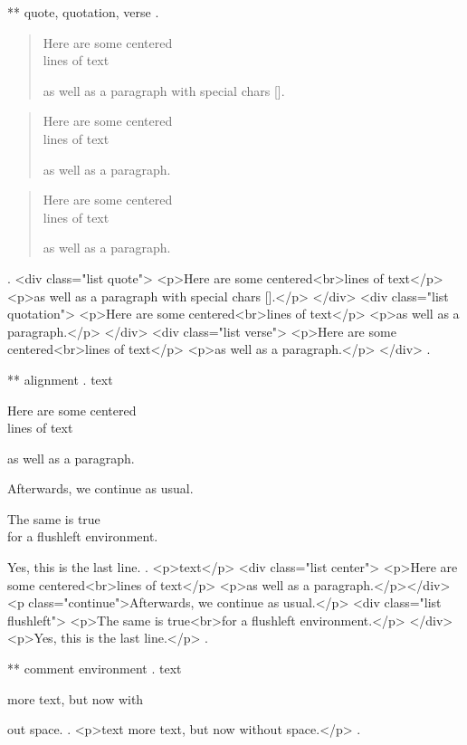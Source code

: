 ** quote, quotation, verse
.
\begin{quote}
    Here are some centered\\
    lines of text

    as well as a paragraph with special chars [].
\end{quote}

\begin{quotation}
    Here are some centered\\
    lines of text

    as well as a paragraph.
\end{quotation}

\begin{verse}
    Here are some centered\\
    lines of text

    as well as a paragraph.
\end{verse}
.
<div class="list quote">
<p>Here are some centered<br>lines of text</p>
<p>as well as a paragraph with special chars [].</p>
</div>
<div class="list quotation">
<p>Here are some centered<br>lines of text</p>
<p>as well as a paragraph.</p>
</div>
<div class="list verse">
<p>Here are some centered<br>lines of text</p>
<p>as well as a paragraph.</p>
</div>
.


** alignment
.
text
\begin{center}
    Here are some centered\\
    lines of text

    as well as a paragraph.
\end{center}
Afterwards, we continue as usual.
\begin{flushleft}
    The same is true\\
    for a flushleft environment.
\end{flushleft}

Yes, this is the last line.
.
<p>text</p>
<div class="list center">
<p>Here are some centered<br>lines of text</p>
<p>as well as a paragraph.</p></div>
<p class="continue">Afterwards, we continue as usual.</p>
<div class="list flushleft">
<p>The same is true<br>for a ﬂushleft environment.</p>
</div>
<p>Yes, this is the last line.</p>
.



** comment environment
.
text
\begin{comment}
    This is a comment.
    \end{comment
    still more comment.
\end{comment}
more text, but now with%
\begin{comment}
    This is a comment.
\end{comment}
out space.
.
<p>text more text, but now without space.</p>
.